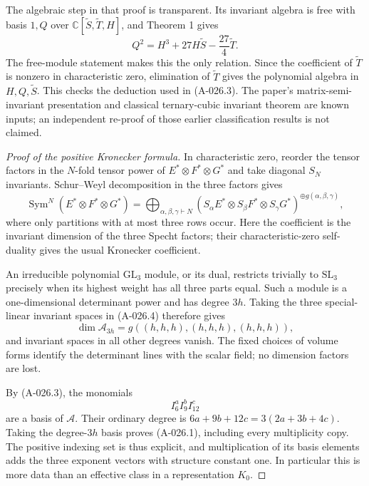 The algebraic step in that proof is transparent. Its invariant
algebra is free with basis $1,Q$ over
$\mathbb C[\widetilde S,\widetilde T,H]$, and Theorem 1 gives
\[
                 Q^2=H^3+27H\widetilde S-\frac{27}{4}\widetilde T.
\]
The free-module statement makes this the only relation.
Since the coefficient of $\widetilde T$ is nonzero in
characteristic zero, elimination of $\widetilde T$ gives
the polynomial algebra in $H,Q,\widetilde S$.
This checks the deduction used in (A-026.3). The paper's
matrix-semi-invariant presentation and classical ternary-cubic
invariant theorem are known inputs; an independent re-proof
of those earlier classification results is not claimed.

\begin{proof}[Proof of the positive Kronecker formula]
In characteristic zero, reorder the tensor factors in the
$N$-fold tensor power of $E^*\otimes F^*\otimes G^*$
and take diagonal $S_N$ invariants. Schur--Weyl decomposition
in the three factors gives
\[
 \operatorname{Sym}^N(E^*\otimes F^*\otimes G^*)
  =\bigoplus_{\alpha,\beta,\gamma\vdash N}
       (S_\alpha E^*\otimes S_\beta F^*\otimes S_\gamma G^*)
                      ^{\oplus g(\alpha,\beta,\gamma)},          \tag{A-026.4}
\]
where only partitions with at most three rows occur. Here
the coefficient is the invariant dimension of the three
Specht factors; their characteristic-zero self-duality gives
the usual Kronecker coefficient.

An irreducible polynomial $\mathrm{GL}_3$ module, or its
dual, restricts trivially to $\mathrm{SL}_3$ precisely when
its highest weight has all three parts equal. Such a module
is a one-dimensional determinant power and has degree $3h$.
Taking the three special-linear invariant spaces in
(A-026.4) therefore gives
\[
           \dim\mathcal A_{3h}
                      =g((h,h,h),(h,h,h),(h,h,h)),                \tag{A-026.5}
\]
and invariant spaces in all other degrees vanish.
The fixed choices of volume forms identify the determinant
lines with the scalar field; no dimension factors are lost.

By (A-026.3), the monomials
\[
                        I_6^a I_9^b I_{12}^c
\]
are a basis of $\mathcal A$. Their ordinary degree is
$6a+9b+12c=3(2a+3b+4c)$. Taking the degree-$3h$ basis
proves (A-026.1), including every multiplicity copy.
The positive indexing set is thus explicit, and multiplication
of its basis elements adds the three exponent vectors with
structure constant one. In particular this is more data
than an effective class in a representation $K_0$.
\end{proof}


